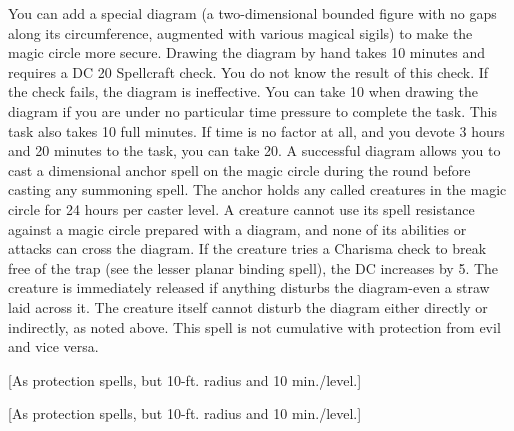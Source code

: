 {You can add a special diagram (a two-dimensional bounded figure with no gaps along its circumference, augmented with various magical sigils) to make the magic circle more secure. Drawing the diagram by hand takes 10 minutes and requires a DC 20 Spellcraft check. You do not know the result of this check. If the check fails, the diagram is ineffective. You can take 10 when drawing the diagram if you are under no particular time pressure to complete the task.
This task also takes 10 full minutes. If time is no factor at all, and you devote 3 hours and 20 minutes to the task, you can take 20.
A successful diagram allows you to cast a dimensional anchor spell on the magic circle during the round before casting any summoning spell. The anchor holds any called creatures in the magic circle for 24 hours per caster level. A creature cannot use its spell resistance against a magic circle prepared with a diagram, and none of its abilities or attacks can cross the diagram. If the creature tries a Charisma check to break free of the trap (see the lesser planar binding spell), the DC increases by 5. The creature is immediately released if anything disturbs the diagram-even a straw laid across it. The creature itself cannot disturb the diagram either directly or indirectly, as noted above.
This spell is not cumulative with protection from evil and vice versa.}
        
[As protection spells, but 10-ft. radius and 10 min./level.]
        
[As protection spells, but 10-ft. radius and 10 min./level.]
        
